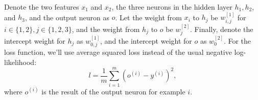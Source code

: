 	Denote the two features $x_1$ and $x_2$, the three neurons in the hidden layer $h_1, h_2$, and $h_3$, and the output neuron as $o$. Let the weight from $x_i$ to $h_j$ be $w_{i, j}^{[1]}$ for $i \in \{1, 2\}, j \in \{1, 2, 3\}$, and the weight from $h_j$ to $o$ be $w_{j}^{[2]}$. Finally, denote the intercept weight for $h_j$ as $w_{0, j}^{[1]}$, and the intercept weight for $o$ as $w_{0}^{[2]}$. For the loss function, we'll use average squared loss instead of the usual negative log-likelihood:
  $$l = \frac{1}{m}\sum_{i=1}^{m}(o^{(i)} - y^{(i)})^2,$$
  where $o^{(i)}$ is the result of the output neuron for example $i$.

\begin{enumerate}

  

  
  
  

\end{enumerate}
